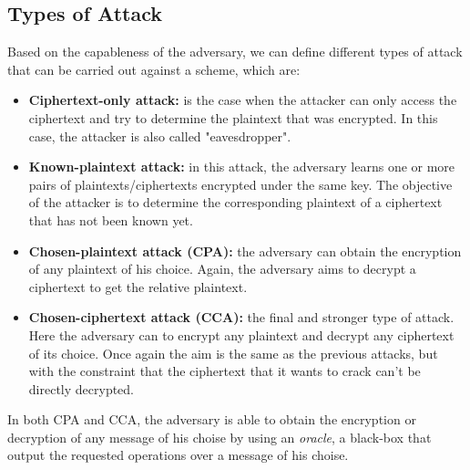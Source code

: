 \begin{nopbreak}
    \subsection{Types of Attack}
    Based on the capableness of the adversary, we can define different types of attack that can be carried out against a scheme, which are:
    \begin{itemize}
        \item{\textbf{Ciphertext-only attack:} is the case when the attacker can only access the ciphertext and try to determine the plaintext that was encrypted. In this case, the attacker is also called "eavesdropper".}
        \item{\textbf{Known-plaintext attack:} in this attack, the adversary learns one or more pairs of plaintexts/ciphertexts encrypted under the same key. The objective of the attacker is to determine the corresponding plaintext of a ciphertext that has not been known yet.}
        \item{\textbf{Chosen-plaintext attack (CPA):} the adversary can obtain the encryption of any plaintext of his choice. Again, the adversary aims to decrypt a ciphertext to get the relative plaintext.}
        \item{\textbf{Chosen-ciphertext attack (CCA):} the final and stronger type of attack. Here the adversary can to encrypt any plaintext and decrypt any ciphertext of its choice. Once again the aim is the same as the previous attacks, but with the constraint that the ciphertext that it wants to crack can't be directly decrypted.}
    \end{itemize}
\end{nopbreak}
In both CPA and CCA, the adversary is able to obtain the encryption or decryption of any message of his choise by using an \emph{oracle}, a black-box that output the requested operations over a message of his choise.

